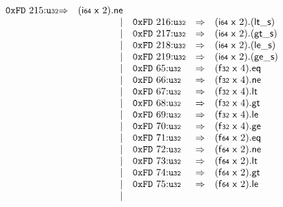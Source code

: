 $$\begin{array}{@{}l@{}rrlll@{}l@{}}
\mathtt{0xFD}~215{:}{\mathtt{u{\scriptstyle32}}} &\Rightarrow& (\mathsf{i{\scriptstyle64}}~\mathsf{x}~2) . \mathsf{ne} \\ &&|&
\mathtt{0xFD}~216{:}{\mathtt{u{\scriptstyle32}}} &\Rightarrow& (\mathsf{i{\scriptstyle64}}~\mathsf{x}~2) . ({\mathsf{lt\_}}{\mathsf{s}}) \\ &&|&
\mathtt{0xFD}~217{:}{\mathtt{u{\scriptstyle32}}} &\Rightarrow& (\mathsf{i{\scriptstyle64}}~\mathsf{x}~2) . ({\mathsf{gt\_}}{\mathsf{s}}) \\ &&|&
\mathtt{0xFD}~218{:}{\mathtt{u{\scriptstyle32}}} &\Rightarrow& (\mathsf{i{\scriptstyle64}}~\mathsf{x}~2) . ({\mathsf{le\_}}{\mathsf{s}}) \\ &&|&
\mathtt{0xFD}~219{:}{\mathtt{u{\scriptstyle32}}} &\Rightarrow& (\mathsf{i{\scriptstyle64}}~\mathsf{x}~2) . ({\mathsf{ge\_}}{\mathsf{s}}) \\ &&|&
\mathtt{0xFD}~65{:}{\mathtt{u{\scriptstyle32}}} &\Rightarrow& (\mathsf{f{\scriptstyle32}}~\mathsf{x}~4) . \mathsf{eq} \\ &&|&
\mathtt{0xFD}~66{:}{\mathtt{u{\scriptstyle32}}} &\Rightarrow& (\mathsf{f{\scriptstyle32}}~\mathsf{x}~4) . \mathsf{ne} \\ &&|&
\mathtt{0xFD}~67{:}{\mathtt{u{\scriptstyle32}}} &\Rightarrow& (\mathsf{f{\scriptstyle32}}~\mathsf{x}~4) . \mathsf{lt} \\ &&|&
\mathtt{0xFD}~68{:}{\mathtt{u{\scriptstyle32}}} &\Rightarrow& (\mathsf{f{\scriptstyle32}}~\mathsf{x}~4) . \mathsf{gt} \\ &&|&
\mathtt{0xFD}~69{:}{\mathtt{u{\scriptstyle32}}} &\Rightarrow& (\mathsf{f{\scriptstyle32}}~\mathsf{x}~4) . \mathsf{le} \\ &&|&
\mathtt{0xFD}~70{:}{\mathtt{u{\scriptstyle32}}} &\Rightarrow& (\mathsf{f{\scriptstyle32}}~\mathsf{x}~4) . \mathsf{ge} \\ &&|&
\mathtt{0xFD}~71{:}{\mathtt{u{\scriptstyle32}}} &\Rightarrow& (\mathsf{f{\scriptstyle64}}~\mathsf{x}~2) . \mathsf{eq} \\ &&|&
\mathtt{0xFD}~72{:}{\mathtt{u{\scriptstyle32}}} &\Rightarrow& (\mathsf{f{\scriptstyle64}}~\mathsf{x}~2) . \mathsf{ne} \\ &&|&
\mathtt{0xFD}~73{:}{\mathtt{u{\scriptstyle32}}} &\Rightarrow& (\mathsf{f{\scriptstyle64}}~\mathsf{x}~2) . \mathsf{lt} \\ &&|&
\mathtt{0xFD}~74{:}{\mathtt{u{\scriptstyle32}}} &\Rightarrow& (\mathsf{f{\scriptstyle64}}~\mathsf{x}~2) . \mathsf{gt} \\ &&|&
\mathtt{0xFD}~75{:}{\mathtt{u{\scriptstyle32}}} &\Rightarrow& (\mathsf{f{\scriptstyle64}}~\mathsf{x}~2) . \mathsf{le} \\ &&|&

\end{array}$$
